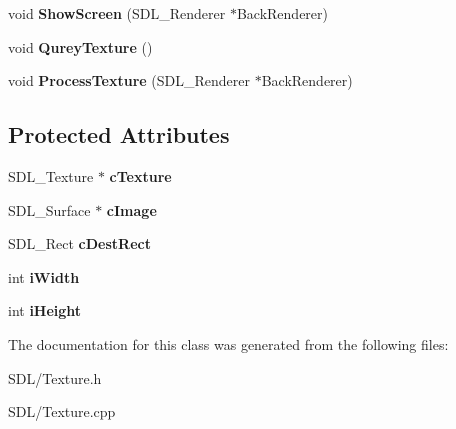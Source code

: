 \begin{DoxyCompactItemize}
\item 
\hypertarget{class_texture_aa15e62be772d329c2e9d49d4d3bc056d}{void {\bfseries Show\+Screen} (S\+D\+L\+\_\+\+Renderer $\ast$Back\+Renderer)}\label{class_texture_aa15e62be772d329c2e9d49d4d3bc056d}

\item 
\hypertarget{class_texture_ab16f87249854565e57dea04d5340e749}{void {\bfseries Qurey\+Texture} ()}\label{class_texture_ab16f87249854565e57dea04d5340e749}

\item 
\hypertarget{class_texture_a25de7f57b9c0f5d118dbbff4658e7ea3}{void {\bfseries Process\+Texture} (S\+D\+L\+\_\+\+Renderer $\ast$Back\+Renderer)}\label{class_texture_a25de7f57b9c0f5d118dbbff4658e7ea3}

\end{DoxyCompactItemize}
\subsection*{Protected Attributes}
\begin{DoxyCompactItemize}
\item 
\hypertarget{class_texture_a6a3681af920ae2d2d7dea0317e817b91}{S\+D\+L\+\_\+\+Texture $\ast$ {\bfseries c\+Texture}}\label{class_texture_a6a3681af920ae2d2d7dea0317e817b91}

\item 
\hypertarget{class_texture_a383889ec8959fbbdcd47f7ab2fd86fa0}{S\+D\+L\+\_\+\+Surface $\ast$ {\bfseries c\+Image}}\label{class_texture_a383889ec8959fbbdcd47f7ab2fd86fa0}

\item 
\hypertarget{class_texture_a21602e597acc6851d97701187cab01b1}{S\+D\+L\+\_\+\+Rect {\bfseries c\+Dest\+Rect}}\label{class_texture_a21602e597acc6851d97701187cab01b1}

\item 
\hypertarget{class_texture_accab810fad8662a19ec8ce15316e0e6e}{int {\bfseries i\+Width}}\label{class_texture_accab810fad8662a19ec8ce15316e0e6e}

\item 
\hypertarget{class_texture_a23ce6d3594246ffd6c794c14a328ba83}{int {\bfseries i\+Height}}\label{class_texture_a23ce6d3594246ffd6c794c14a328ba83}

\end{DoxyCompactItemize}


The documentation for this class was generated from the following files\+:\begin{DoxyCompactItemize}
\item 
S\+D\+L/Texture.\+h\item 
S\+D\+L/Texture.\+cpp\end{DoxyCompactItemize}
